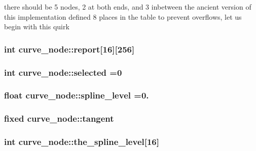 there should be 5 nodes, 2 at both ends, and 3 inbetween the ancient version of this implementation defined 8 places in the table to prevent overflows, let us begin with this quirk \hypertarget{classcurve__node_a348cce4dfe54130e8b8b2fb218baedfb}{
\subsubsection[{report}]{\setlength{\rightskip}{0pt plus 5cm}int curve\+\_\+node\+::report\mbox{[}16\mbox{]}\mbox{[}256\mbox{]}\hspace{0.3cm}{\ttfamily [static]}}}\label{classcurve__node_a348cce4dfe54130e8b8b2fb218baedfb}
\hypertarget{classcurve__node_abe017d998cde30d2ca5f7c8ea68ba3da}{
\subsubsection[{selected}]{\setlength{\rightskip}{0pt plus 5cm}int curve\+\_\+node\+::selected =0\hspace{0.3cm}{\ttfamily [static]}}}\label{classcurve__node_abe017d998cde30d2ca5f7c8ea68ba3da}
\hypertarget{classcurve__node_a16c72a6637b3b68983b5ce55b90665bf}{
\subsubsection[{spline\+\_\+level}]{\setlength{\rightskip}{0pt plus 5cm}float curve\+\_\+node\+::spline\+\_\+level =0.\hspace{0.3cm}{\ttfamily [static]}}}\label{classcurve__node_a16c72a6637b3b68983b5ce55b90665bf}
\hypertarget{classcurve__node_a31ea7469070f7bb90ceae073d1d075a6}{
\subsubsection[{tangent}]{\setlength{\rightskip}{0pt plus 5cm}fixed curve\+\_\+node\+::tangent}}\label{classcurve__node_a31ea7469070f7bb90ceae073d1d075a6}
\hypertarget{classcurve__node_a62eb9b6b3a24274664775a07c565d39c}{
\subsubsection[{the\+\_\+spline\+\_\+level}]{\setlength{\rightskip}{0pt plus 5cm}int curve\+\_\+node\+::the\+\_\+spline\+\_\+level\mbox{[}16\mbox{]}\hspace{0.3cm}{\ttfamily [static]}}}\label{classcurve__node_a62eb9b6b3a24274664775a07c565d39c}
